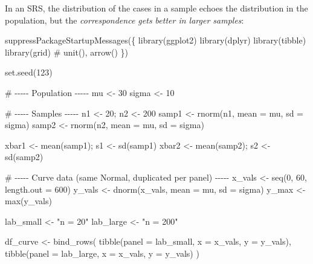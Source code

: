 \documentclass[
  letterpaper,
  DIV=11,
  numbers=noendperiod]{scrreprt}
\newenvironment{Shaded}{\begin{snugshade}}{\end{snugshade}}
\newcommand{\AttributeTok}[1]{\textcolor[rgb]{0.40,0.45,0.13}{#1}}
\newcommand{\CommentTok}[1]{\textcolor[rgb]{0.37,0.37,0.37}{#1}}
\newcommand{\DecValTok}[1]{\textcolor[rgb]{0.68,0.00,0.00}{#1}}
\newcommand{\FunctionTok}[1]{\textcolor[rgb]{0.28,0.35,0.67}{#1}}
\newcommand{\NormalTok}[1]{\textcolor[rgb]{0.00,0.23,0.31}{#1}}
\newcommand{\OtherTok}[1]{\textcolor[rgb]{0.00,0.23,0.31}{#1}}
\newcommand{\StringTok}[1]{\textcolor[rgb]{0.13,0.47,0.30}{#1}}
\begin{document}
In an SRS, the distribution of the cases in a sample echoes the
distribution in the population, but the \emph{correspondence gets better
in larger samples}:

\begin{Shaded}
\begin{Highlighting}[]
\FunctionTok{suppressPackageStartupMessages}\NormalTok{(\{}
  \FunctionTok{library}\NormalTok{(ggplot2)}
  \FunctionTok{library}\NormalTok{(dplyr)}
  \FunctionTok{library}\NormalTok{(tibble)}
  \FunctionTok{library}\NormalTok{(grid)   }\CommentTok{\# unit(), arrow()}
\NormalTok{\})}

\FunctionTok{set.seed}\NormalTok{(}\DecValTok{123}\NormalTok{)}

\CommentTok{\# {-}{-}{-}{-}{-} Population {-}{-}{-}{-}{-}}
\NormalTok{mu    }\OtherTok{\textless{}{-}} \DecValTok{30}
\NormalTok{sigma }\OtherTok{\textless{}{-}} \DecValTok{10}

\CommentTok{\# {-}{-}{-}{-}{-} Samples {-}{-}{-}{-}{-}}
\NormalTok{n1 }\OtherTok{\textless{}{-}} \DecValTok{20}\NormalTok{;  n2 }\OtherTok{\textless{}{-}} \DecValTok{200}
\NormalTok{samp1 }\OtherTok{\textless{}{-}} \FunctionTok{rnorm}\NormalTok{(n1, }\AttributeTok{mean =}\NormalTok{ mu, }\AttributeTok{sd =}\NormalTok{ sigma)}
\NormalTok{samp2 }\OtherTok{\textless{}{-}} \FunctionTok{rnorm}\NormalTok{(n2, }\AttributeTok{mean =}\NormalTok{ mu, }\AttributeTok{sd =}\NormalTok{ sigma)}

\NormalTok{xbar1 }\OtherTok{\textless{}{-}} \FunctionTok{mean}\NormalTok{(samp1); s1 }\OtherTok{\textless{}{-}} \FunctionTok{sd}\NormalTok{(samp1)}
\NormalTok{xbar2 }\OtherTok{\textless{}{-}} \FunctionTok{mean}\NormalTok{(samp2); s2 }\OtherTok{\textless{}{-}} \FunctionTok{sd}\NormalTok{(samp2)}

\CommentTok{\# {-}{-}{-}{-}{-} Curve data (same Normal, duplicated per panel) {-}{-}{-}{-}{-}}
\NormalTok{x\_vals }\OtherTok{\textless{}{-}} \FunctionTok{seq}\NormalTok{(}\DecValTok{0}\NormalTok{, }\DecValTok{60}\NormalTok{, }\AttributeTok{length.out =} \DecValTok{600}\NormalTok{)}
\NormalTok{y\_vals }\OtherTok{\textless{}{-}} \FunctionTok{dnorm}\NormalTok{(x\_vals, }\AttributeTok{mean =}\NormalTok{ mu, }\AttributeTok{sd =}\NormalTok{ sigma)}
\NormalTok{y\_max  }\OtherTok{\textless{}{-}} \FunctionTok{max}\NormalTok{(y\_vals)}

\NormalTok{lab\_small }\OtherTok{\textless{}{-}} \StringTok{"n = 20"}
\NormalTok{lab\_large }\OtherTok{\textless{}{-}} \StringTok{"n = 200"}

\NormalTok{df\_curve }\OtherTok{\textless{}{-}} \FunctionTok{bind\_rows}\NormalTok{(}
  \FunctionTok{tibble}\NormalTok{(}\AttributeTok{panel =}\NormalTok{ lab\_small, }\AttributeTok{x =}\NormalTok{ x\_vals, }\AttributeTok{y =}\NormalTok{ y\_vals),}
  \FunctionTok{tibble}\NormalTok{(}\AttributeTok{panel =}\NormalTok{ lab\_large, }\AttributeTok{x =}\NormalTok{ x\_vals, }\AttributeTok{y =}\NormalTok{ y\_vals)}
\NormalTok{)}


\end{Highlighting}
\end{Shaded}
\end{document}
